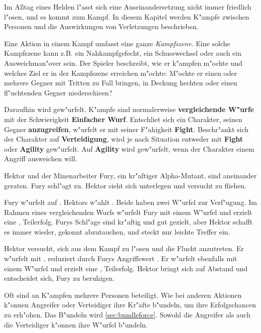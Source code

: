 
Im Alltag eines Helden l"asst sich eine Auseinandersetzung nicht immer friedlich l"osen, und es kommt zum Kampf. In diesem Kapitel werden K"ampfe zwischen Personen und die Auswirkungen von Verletzungen beschrieben.

Eine Aktion in einem Kampf umfasst eine ganze \emph{Kampfszene}. Eine solche Kampfszene kann z.B. ein Nahkampfgefecht, ein Schusswechsel oder auch ein Ausweichman"over sein. Der Spieler beschreibt, wie er k"ampfen m"ochte und welches Ziel er in der Kampfszene erreichen m"ochte: M"ochte er einen oder mehrere Gegner mit Tritten zu Fall bringen, in Deckung hechten oder einen fl"uchtenden Gegner niederschie\3en?

Daraufhin wird gew"urfelt. K"ampfe sind normalerweise \textbf{vergleichende W"urfe} mit der Schwierigkeit \textbf{Einfacher Wurf}. Entschlie\3t sich ein Charakter, seinen Gegner \textbf{anzugreifen}, w"urfelt er mit seiner F"ahigkeit \textbf{Fight}. Beschr"ankt sich der Charakter auf \textbf{Verteidigung}, wird je nach Situation entweder mit \textbf{Fight} oder \textbf{Agility} gew"urfelt. Auf \textbf{Agility} wird gew"urfelt, wenn der Charakter einem Angriff ausweichen will.

\begin{ruleexample}
    Hektor und der Minenarbeiter Fury, ein kr"aftiger Alpha-Mutant, sind aneinander geraten. Fury schl"agt zu. Hektor sieht sich unterlegen und versucht zu fliehen.

    Fury w"urfelt auf . Hektors w"ahlt . Beide haben zwei W"urfel zur Verf"ugung. Im Rahmen eines vergleichenden Wurfs w"urfelt Fury mit einem W"urfel und erzielt eine , Teilerfolg. Furys Schl"age sind kr"aftig und gut gezielt, aber Hektor schafft es immer wieder, gekonnt abzutauchen, und steckt nur leichte Treffer ein.

    Hektor versucht, sich aus dem Kampf zu l"osen und die Flucht anzutreten. Er w"urfelt mit , reduziert durch Furys Angriffswert . Er w"urfelt ebenfalls mit einem W"urfel und erzielt eine , Teilerfolg. Hektor bringt sich auf Abstand und entscheidet sich, Fury zu beruhigen.
\end{ruleexample}

Oft sind an K"ampfen mehrere Personen beteiligt. Wie bei anderen Aktionen k"onnen Angreifer oder Verteidiger ihre Kr"afte b"undeln, um ihre Erfolgschancen zu erh"ohen. Das B"undeln wird \cref{sec:bundleforce}. Sowohl die Angreifer als auch die Verteidiger k"onnen ihre W"urfel b"undeln.

